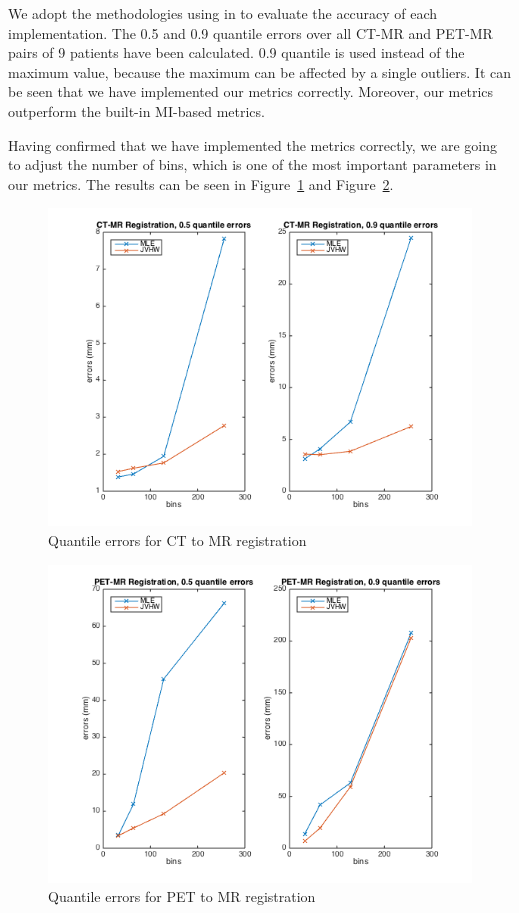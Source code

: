 \documentclass{IEEEtran}
\begin{document}
  We adopt the methodologies using in \cite{pluim2004f} to evaluate the accuracy of each implementation. The 0.5 and 0.9 quantile errors over all CT-MR and PET-MR pairs of 9 patients have been calculated. 0.9 quantile is used instead of the maximum value, because the maximum can be affected by a single outliers. It can be seen that we have implemented our metrics correctly. Moreover, our metrics outperform the built-in MI-based metrics.

  Having confirmed that we have implemented the metrics correctly, we are going to adjust the number of bins, which is one of the most important parameters in our metrics. The results can be seen in Figure~\ref{fig:CT-MLE-JVHW} and Figure~\ref{fig:PET-MLE-JVHW}.

  \begin{figure}[htbp]
    \centering
    \includegraphics[width=\columnwidth]{CT-MLE-JVHW.png}
    \caption{Quantile errors for CT to MR registration}
    \label{fig:CT-MLE-JVHW}
  \end{figure}

  \begin{figure}[htbp]
    \centering
    \includegraphics[width=\columnwidth]{PET-MLE-JVHW.png}
    \caption{Quantile errors for PET to MR registration}
    \label{fig:PET-MLE-JVHW}
  \end{figure}
\end{document}
